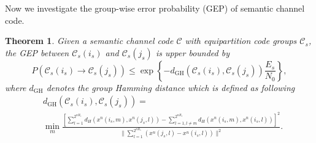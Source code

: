 \documentclass[12pt, draftclsnofoot,onecolumn]{IEEEtran}
\newtheorem{theorem}{\bf{Theorem}}
\begin{document}
Now we investigate the group-wise error probability (GEP) of semantic channel code.
\begin{theorem}
Given a semantic channel code $\mathcal{C}$ with equipartition code groups $\mathcal{C}_s$, the GEP between $\mathcal{C}_s(i_s)$ and $\mathcal{C}_s(j_s)$ is upper bounded by
\begin{equation}
P\left({\mathcal{C}_s}(i_s)\to{\mathcal{C}_s}(j_s)\right) \leq \exp\left\{-d_\text{GH}(\mathcal{C}_s(i_s),\mathcal{C}_s(j_s)) \frac{E_s}{N_0}\right\},
\end{equation}
where $d_\text{GH}$ denotes the group Hamming distance which is defined as following%
\begin{equation}
\begin{aligned}
& d_\text{GH}(\mathcal{C}_s(i_s),\mathcal{C}_s(j_s))=\\
&\min_{m} \frac{\left[\sum_{l=1}^{2^{nR_s}} d_H(x^n(i_s,m),x^n(j_s,l))-\sum_{l=1,l\neq m}^{2^{nR_s}} d_H( x^n(i_s,m),x^n(i_s,l))\right]^2}
       { \|\sum_{l=1}^{2^{nR_s}} \left(x^n(j_s,l)-x^n(i_s,l)\right)\|^2 }.
\end{aligned}
\end{equation}
\end{theorem}
\end{document}
